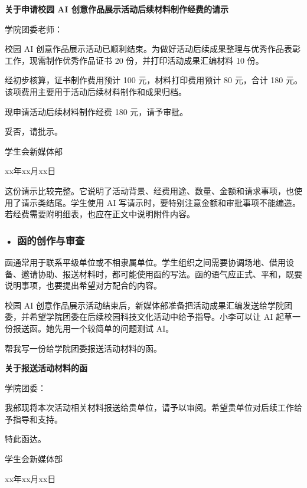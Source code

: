 \begin{aibox}
\begin{center}
\textbf{关于申请校园 AI 创意作品展示活动后续材料制作经费的请示}
\end{center}

\noindent 学院团委老师：

\par\qquad 校园 AI 创意作品展示活动已顺利结束。为做好活动后续成果整理与优秀作品表彰工作，现需制作优秀作品证书 20 份，并打印活动成果汇编材料 10 份。

\par\qquad 经初步核算，证书制作费用预计 100 元，材料打印费用预计 80 元，合计 180 元。该项费用主要用于活动后续材料制作和成果归档。

\par\qquad 现申请活动后续材料制作经费 180 元，请予审批。

\par\qquad 妥否，请批示。

\par\hfill 学生会新媒体部

\par\hfill xx年xx月xx日
\end{aibox}

这份请示比较完整。它说明了活动背景、经费用途、数量、金额和请求事项，也使用了请示类结尾。学生使用 AI 写请示时，要特别注意金额和审批事项不能编造。若经费需要附明细表，也应在正文中说明附件内容。

\subsubsection*{\textbf{• 函的创作与审查}}

函通常用于联系平级单位或不相隶属单位。学生组织之间需要协调场地、借用设备、邀请协助、报送材料时，都可能使用函的写法。函的语气应正式、平和，既要说明事项，也要提出希望对方配合的内容。

校园 AI 创意作品展示活动结束后，新媒体部准备把活动成果汇编发送给学院团委，并希望学院团委在后续校园科技文化活动中给予指导。小李可以让 AI 起草一份报送函。她先用一个较简单的问题测试 AI。

\begin{userbox}
帮我写一份给学院团委报送活动材料的函。
\end{userbox}

\begin{aibox}
\begin{center}
\textbf{关于报送活动材料的函}
\end{center}

\noindent 学院团委：

\par\qquad 我部现将本次活动相关材料报送给贵单位，请予以审阅。希望贵单位对后续工作给予指导和支持。

\par\qquad 特此函达。

\par\hfill 学生会新媒体部

\par\hfill xx年xx月xx日
\end{aibox}

